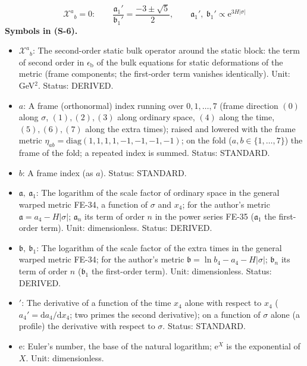 \documentclass[
  10pt,
]{article}
\providecommand{\tightlist}{%
  \setlength{\itemsep}{0pt}\setlength{\parskip}{0pt}}
\begin{document}
\[
\mathcal{X}^a{}_b = 0:\qquad \frac{\mathfrak{a}_1'}{\mathfrak{b}_1'} = \frac{-3 \pm \sqrt5}{2},\qquad
\mathfrak{a}_1',\ \mathfrak{b}_1' \propto \mathrm{e}^{3H\lvert\sigma\rvert} \tag{S-6}
\] \textbf{Symbols in (S-6).}

\begin{itemize}
\tightlist
\item
  \(\mathcal{X}^a{}_b\): The second-order static bulk operator around
  the static block: the term of second order in
  \(\epsilon_{\mathrm{b}}\) of the bulk equations for static
  deformations of the metric (frame components; the first-order term
  vanishes identically). Unit: GeV\(^2\). Status: DERIVED.
\item
  \(a\): A frame (orthonormal) index running over \(0, 1, \dots, 7\)
  (frame direction \((0)\) along \(\sigma\), \((1), (2), (3)\) along
  ordinary space, \((4)\) along the time, \((5), (6), (7)\) along the
  extra times); raised and lowered with the frame metric
  \(\eta_{ab} = \mathrm{diag}(1, 1, 1, 1, -1, -1, -1, -1)\); on the fold
  (\(a, b \in \{1, \dots, 7\}\)) the frame of the fold; a repeated index
  is summed. Status: STANDARD.
\item
  \(b\): A frame index (as \(a\)). Status: STANDARD.
\item
  \(\mathfrak{a},\ \mathfrak{a}_1\): The logarithm of the scale factor
  of ordinary space in the general warped metric FE-34, a function of
  \(\sigma\) and \(x_4\); for the author's metric
  \(\mathfrak{a} = a_4 - H\lvert\sigma\rvert\); \(\mathfrak{a}_n\) its
  term of order \(n\) in the power series FE-35 (\(\mathfrak{a}_1\) the
  first-order term). Unit: dimensionless. Status: DERIVED.
\item
  \(\mathfrak{b},\ \mathfrak{b}_1\): The logarithm of the scale factor
  of the extra times in the general warped metric FE-34; for the
  author's metric
  \(\mathfrak{b} = \ln b_4 - a_4 - H\lvert\sigma\rvert\);
  \(\mathfrak{b}_n\) its term of order \(n\) (\(\mathfrak{b}_1\) the
  first-order term). Unit: dimensionless. Status: DERIVED.
\item
  \({}'\): The derivative of a function of the time \(x_4\) alone with
  respect to \(x_4\) (\(a_4' = \mathrm{d}a_4/\mathrm{d}x_4\); two primes
  the second derivative); on a function of \(\sigma\) alone (a profile)
  the derivative with respect to \(\sigma\). Status: STANDARD.
\item
  \(\mathrm{e}\): Euler's number, the base of the natural logarithm;
  \(\mathrm{e}^{X}\) is the exponential of \(X\). Unit: dimensionless.

\end{itemize}
\end{document}
